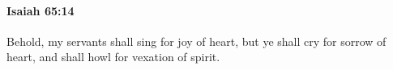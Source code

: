 
		\paragraph{Isaiah 65:14} %
			\label{ISAIAH-65-14}

			Behold, my servants shall sing for joy of heart, but ye shall cry for sorrow of heart, and shall howl for vexation of spirit.



